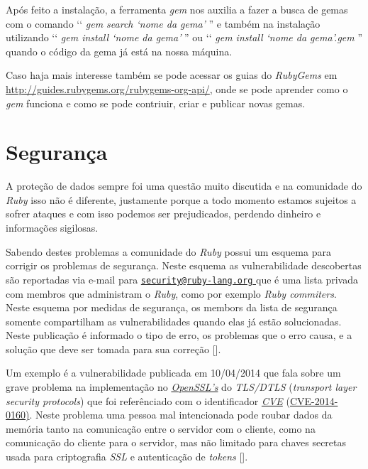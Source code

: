 Após feito a instalação, a ferramenta \emph{gem} nos auxilia a fazer a busca de gemas com o comando 
‘‘ \emph{gem search ‘nome da gema' }'' e também na instalação utilizando ‘‘ \emph{gem install ‘nome 
da gema' }'' ou ‘‘ \emph{gem install ‘nome da gema'.gem }'' quando o código da gema já está na nossa máquina.

Caso haja mais interesse também se pode acessar os guias do \emph{RubyGems} em 
\url{http://guides.rubygems.org/rubygems-org-api/}, onde se pode aprender como o \emph{gem} funciona e como
se pode contriuir, criar e publicar novas gemas. 

\section{Segurança}
\label{segurança_ruby}

A proteção de dados sempre foi uma questão muito discutida e na comunidade do \emph{Ruby} isso não é 
diferente, justamente porque a todo momento estamos sujeitos a sofrer ataques e com isso podemos ser 
prejudicados, perdendo dinheiro e informações sigilosas.

Sabendo destes problemas a comunidade do \emph{Ruby} possui um esquema para corrigir os problemas de 
segurança. Neste esquema as vulnerabilidade descobertas são reportadas via e-mail para
\href{mailto:security@ruby-lang.org}{\nolinkurl{security@ruby-lang.org} } que é uma lista privada com 
membros que administram o \emph{Ruby}, como por exemplo \emph{Ruby commiters}. Neste esquema por medidas 
de segurança, os membors da lista de segurança somente compartilham as vulnerabilidades quando elas já 
estão solucionadas. Neste publicação é informado o tipo de erro, os problemas que o erro causa, e a 
solução que deve ser tomada para 
sua correção [].

Um exemplo é a vulnerabilidade publicada em 10/04/2014 que fala sobre um grave problema na 
implementação no \emph{\href{https://www.openssl.org}{OpenSSL’s}} do \emph{TLS/DTLS} (\emph{transport 
layer security protocols}) que foi referênciado com o identificador \emph{\href{https://cve.mitre.org/}{CVE}} 
(\href{https://web.nvd.nist.gov/view/vuln/detail?vulnId=CVE-2014-0160}{CVE-2014-0160)}. Neste problema 
uma pessoa mal intencionada pode roubar dados da memória tanto na comunicação entre o servidor com o cliente,
como na comunicação do cliente para o servidor, mas não limitado para chaves secretas usada para criptografia
\emph{SSL} e autenticação de \emph{tokens} [].


